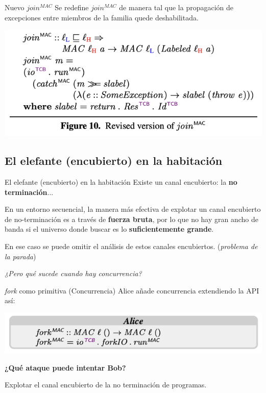 \documentclass{beamer}
\begin{document}
\begin{frame}{Nuevo $join^{MAC}$}
    Se redefine $join^{MAC}$ de manera tal que la propagación de excepciones entre miembros de la familia quede deshabilitada.

    \begin{center}
        \includegraphics[scale=0.7]{figure10.png}
    \end{center}
\end{frame}

\subsection{El elefante (encubierto) en la habitación}
\begin{frame}{El elefante (encubierto) en la habitación}
    Existe un canal encubierto: la \textbf{no terminación}...\newline

    En un entorno secuencial, la manera más efectiva de explotar un canal encubierto de no-terminación es a través de \textbf{fuerza bruta}, por lo que no hay gran ancho de banda si el universo donde buscar es lo \textbf{suficientemente grande}. \newline
    
    En ese caso se puede omitir el análisis de estos canales encubiertos. (\textit{problema de la parada})

    \vspace{0.5cm}
    \pause
    \begin{flushright}
        \it{¿Pero qué sucede cuando hay concurrencia?}
    \end{flushright}
    
\end{frame}

\begin{frame}{\textit{fork} como primitiva (Concurrencia)}
    Alice añade concurrencia extendiendo la API así:

    \begin{center}
        \includegraphics[scale=0.8]{codigo_alice2.png}
    \end{center}

    \textbf{¿Qué ataque puede intentar Bob?}\newline

    Explotar el canal encubierto de la no terminación de programas.
\end{frame}
\end{document}
